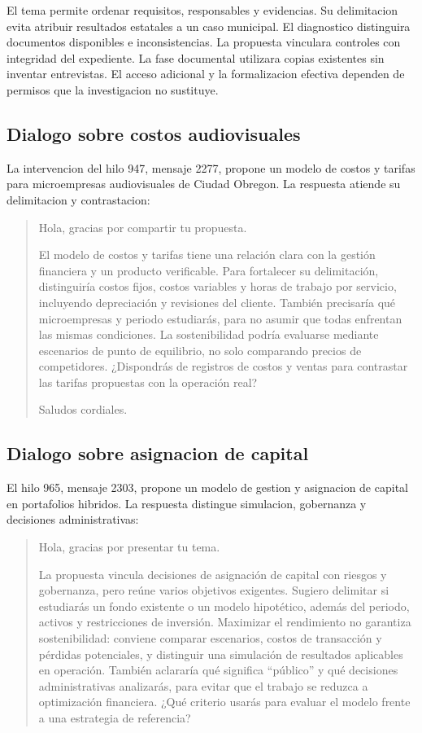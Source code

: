 {El tema permite ordenar requisitos, responsables y evidencias. Su delimitacion evita atribuir resultados estatales a un caso municipal. El diagnostico distinguira documentos disponibles e inconsistencias. La propuesta vinculara controles con integridad del expediente. La fase documental utilizara copias existentes sin inventar entrevistas. El acceso adicional y la formalizacion efectiva dependen de permisos que la investigacion no sustituye.
\subsection{Dialogo sobre costos audiovisuales}
La intervencion del hilo 947, mensaje 2277, propone un modelo de costos y tarifas para microempresas audiovisuales de Ciudad Obregon. La respuesta atiende su delimitacion y contrastacion:
\begin{quote}
Hola, gracias por compartir tu propuesta.

El modelo de costos y tarifas tiene una relación clara con la gestión financiera y un producto verificable. Para fortalecer su delimitación, distinguiría costos fijos, costos variables y horas de trabajo por servicio, incluyendo depreciación y revisiones del cliente. También precisaría qué microempresas y periodo estudiarás, para no asumir que todas enfrentan las mismas condiciones. La sostenibilidad podría evaluarse mediante escenarios de punto de equilibrio, no solo comparando precios de competidores. ¿Dispondrás de registros de costos y ventas para contrastar las tarifas propuestas con la operación real?

Saludos cordiales.
\end{quote}
\subsection{Dialogo sobre asignacion de capital}
El hilo 965, mensaje 2303, propone un modelo de gestion y asignacion de capital en portafolios hibridos. La respuesta distingue simulacion, gobernanza y decisiones administrativas:
\begin{quote}
Hola, gracias por presentar tu tema.

La propuesta vincula decisiones de asignación de capital con riesgos y gobernanza, pero reúne varios objetivos exigentes. Sugiero delimitar si estudiarás un fondo existente o un modelo hipotético, además del periodo, activos y restricciones de inversión. Maximizar el rendimiento no garantiza sostenibilidad: conviene comparar escenarios, costos de transacción y pérdidas potenciales, y distinguir una simulación de resultados aplicables en operación. También aclararía qué significa ``público'' y qué decisiones administrativas analizarás, para evitar que el trabajo se reduzca a optimización financiera. ¿Qué criterio usarás para evaluar el modelo frente a una estrategia de referencia?


\end{quote}}
